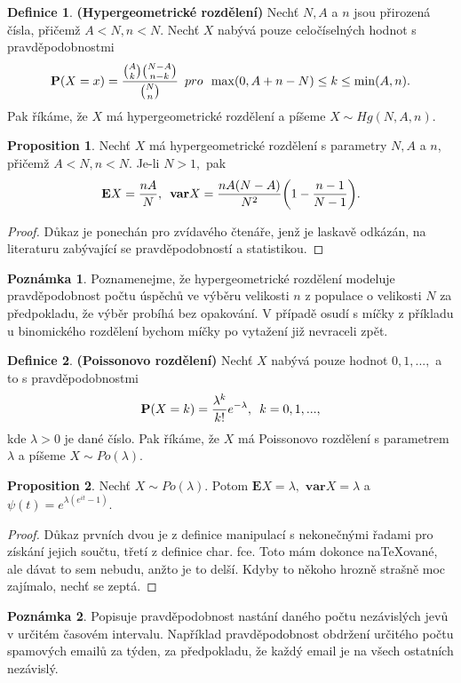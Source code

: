 \documentclass[a4]{report}
\theoremstyle{definition}
\newtheorem{definition}{Definice}[section]
\newtheorem{remark}{Poznámka}[section]
\newtheorem{proposition}{Proposition}[section]
\begin{document}
{\begin{definition}{\textbf{(Hypergeometrické rozdělení)}}
Nechť $N, A$ a $n$ jsou přirozená čísla, přičemž $A < N, n < N$. Nechť $X$ nabývá pouze celočíselných hodnot s pravděpodobnostmi 
\begin{equation}
\textbf{P}(X = x)= \frac{\binom{A}{k}\binom{N-A}{n-k}}{\binom{N}{n}} \enskip pro \enskip \max(0, A + n -N)\leq k \leq \min(A, n).
\end{equation}
Pak říkáme, že $X$ má hypergeometrické rozdělení a píšeme $X \sim Hg(N,A,n)$.
\end{definition}
\begin{proposition}
Nechť $X$ má hypergeometrické rozdělení s parametry $N, A$ a $n$, přičemž $A < N, n < N$.  Je-li $N > 1,$ pak 
\begin{equation}
\mathbf{E}X = \frac{nA}{N}, \enskip \mathbf{var}X = \frac{nA(N-A)}{N^{2}}\bigg( 1 - \frac{n-1}{N-1}\bigg).
\end{equation}
\end{proposition}
\begin{proof}
Důkaz je ponechán pro zvídavého čtenáře, jenž je laskavě odkázán, na literaturu zabývající se pravděpodobností a statistikou.
\end{proof}

\begin{remark}
Poznamenejme, že hypergeometrické rozdělení modeluje pravděpodobnost počtu úspěchů ve výběru velikosti $n$ z populace o velikosti $N$ za předpokladu, že výběr probíhá bez opakování. V případě osudí s míčky z příkladu u binomického rozdělení bychom míčky po vytažení již nevraceli zpět.
\end{remark}

\begin{definition}{\textbf{(Poissonovo rozdělení)}}
Nechť $X$ nabývá pouze hodnot $0, 1, ..., $ a to s pravděpodobnostmi 
\begin{equation}
\textbf{P}(X = k) = \frac{\lambda^{k}}{k!}e^{-\lambda},\enskip k = 0, 1, ...,
\end{equation}
kde $\lambda >0$ je dané číslo. Pak říkáme, že $X$ má Poissonovo rozdělení s parametrem $\lambda$ a píšeme $X \sim Po(\lambda)$.
\end{definition}

\begin{proposition}
Nechť $X \sim Po(\lambda)$. Potom $\mathbf{E}X = \lambda,$ $\mathbf{var}X = \lambda$ a $\psi(t) = e^{\lambda(e^{it}-1)}$.
\end{proposition}
\begin{proof}
Důkaz prvních dvou je z definice manipulací s nekonečnými řadami pro získání jejich součtu, třetí z definice char. fce. Toto mám dokonce naTeXované, ale dávat to sem nebudu, anžto je to delší. Kdyby to někoho hrozně strašně moc zajímalo, nechť se zeptá.
\end{proof}
\begin{remark}
Popisuje pravděpodobnost nastání daného počtu nezávislých jevů v určitém časovém intervalu. Například pravděpodobnost obdržení určitého počtu spamových emailů za týden, za předpokladu, že každý email je na všech ostatních nezávislý.
\end{remark}

}
\end{document}
